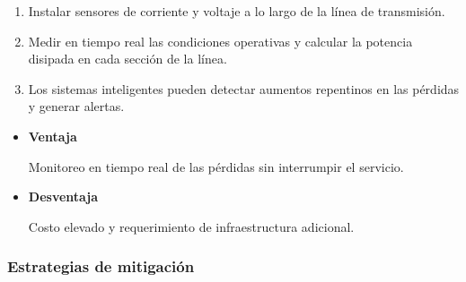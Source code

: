                 \begin{enumerate}
                    \item Instalar sensores de corriente y voltaje a lo largo de la línea de transmisión.
                    
                    \item Medir en tiempo real las condiciones operativas y calcular la potencia disipada en cada sección de la línea.
                    
                    \item Los sistemas inteligentes pueden detectar aumentos repentinos en las pérdidas y generar alertas.
                    
                \end{enumerate}

            \begin{itemize}
                \item \textbf{Ventaja}

                    Monitoreo en tiempo real de las pérdidas sin interrumpir el servicio.
                    
                \item \textbf{Desventaja}

                      Costo elevado y requerimiento de infraestructura adicional.
            \end{itemize}

            
        \subsubsection{Estrategias de mitigación}

